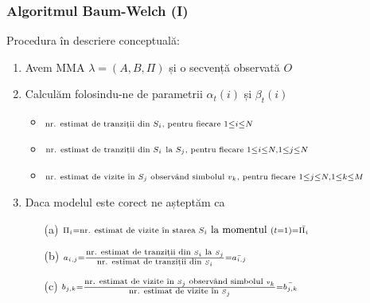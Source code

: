 \begin{frame}[fragile, t]
	\frametitle{Algoritmul Baum-Welch (I)}
	Procedura în descriere conceptuală:	
	\vspace*{0.5em}
	\footnotesize{
	\begin{enumerate}
		\item Avem MMA $\lambda = (A, B, \Pi)$ și o secvență observată $O$%
		\vspace*{0.5em}
		\pause
		
		\item Calculăm folosindu-ne de parametrii $\alpha_t(i)$ și $\beta_t(i)$			
			\begin{itemize}
				\item	$\scriptstyle 	\mbox{\scriptsize{nr. estimat de tranziții din }} S_i 
										\mbox{\scriptsize{, pentru fiecare} } 
				1 \le i \le N$%
				\vspace*{0.5em}
				\item	$\scriptstyle 	\mbox{\scriptsize{nr. estimat de tranziții din }} S_i 
										\mbox{ \scriptsize{la }} S_j 
										\mbox{\scriptsize{, pentru fiecare }} 1 \le i \le N, 1 \le j \le N$%
				\vspace*{0.5em}
				\item 	$\scriptstyle	\mbox{\scriptsize{nr. estimat de vizite în }} S_j 
										\mbox{\scriptsize{ observând simbolul }} v_k
										\mbox{\scriptsize{, pentru fiecare }} 1 \le j \le N, 1 \le k \le M$%
			\end{itemize}
		\vspace*{0.5em}		
		\pause
		
		\item Daca modelul este corect ne așteptăm ca
			\begin{enumerate}
				\item[(a)] $\scriptstyle \Pi_i = \mbox{{\scriptsize nr. estimat de vizite în starea }} 
													S_i \mbox{\small{ la momentul }} (t=1) = \bar{\Pi_i} $%
				\vspace*{0.5em}
				\item[(b)] $\scriptstyle a_{i,j} = \frac{\mbox{\scriptsize{nr. estimat de tranziții din }} S_i 
											\mbox{\scriptsize{ la }} S_j}
											{\mbox{\scriptsize{nr. estimat de tranziții din }} S_i} = \bar{a_{i,j}}$%
				\vspace*{0.5em}
				\item[(c)] $\scriptstyle b_{j,k} = \frac{\mbox{\scriptsize{nr. estimat de vizite în }} S_j 
											\mbox{\scriptsize{ observând simbolul }} v_k}
											{\mbox{\scriptsize{nr. estimat de vizite în }} S_j} = \bar{b_{j,k}}$%
			\end{enumerate}
		\vspace*{0.5em}		
		\pause
		

\end{enumerate}}
\end{frame}
